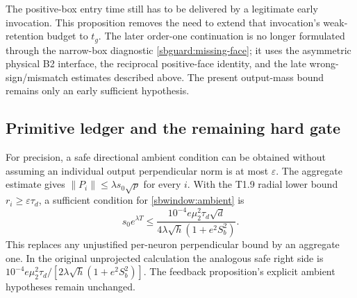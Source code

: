 \documentclass{article} %
\theoremstyle{plain}
\theoremstyle{definition}
\theoremstyle{remark}
\begin{document}
The positive-box entry time still has to be delivered by a legitimate
early invocation. This proposition removes the need to extend that
invocation's weak-retention budget to $t_g$.  The later order-one continuation
is no longer formulated through the narrow-box diagnostic
\eqref{sbguard:missing-face}; it uses the asymmetric physical B2 interface,
the reciprocal positive-face identity, and the late wrong-sign/mismatch
estimates described above.  The present output-mass bound remains only an
early sufficient hypothesis.

\subsection{Primitive ledger and the remaining hard gate}

For precision, a safe directional ambient condition can be obtained
without assuming an individual output perpendicular norm is at most
$\varepsilon$. The aggregate estimate gives
$\|P_i\|\le\lambda s_0\sqrt p$ for every $i$. With the T1.9 radial
lower bound $r_i\ge\varepsilon\tau_d$, a sufficient condition for
\eqref{sbwindow:ambient} is
\begin{equation}\label{sbguard:ambient-primitive}
 s_0e^{\lambda T}\le
 \frac{10^{-4}e\mu_2^2\tau_d\sqrt d}
             {4\lambda\sqrt h(1+e^2S_b^2)}.
\end{equation}
This replaces any unjustified per-neuron perpendicular bound by an
aggregate one. In the original unprojected calculation the analogous
safe right side is
$10^{-4}e\mu_2^2\tau_d/[2\lambda\sqrt h(1+e^2S_b^2)]$.
The feedback proposition's explicit ambient hypotheses remain unchanged.
\end{document}

